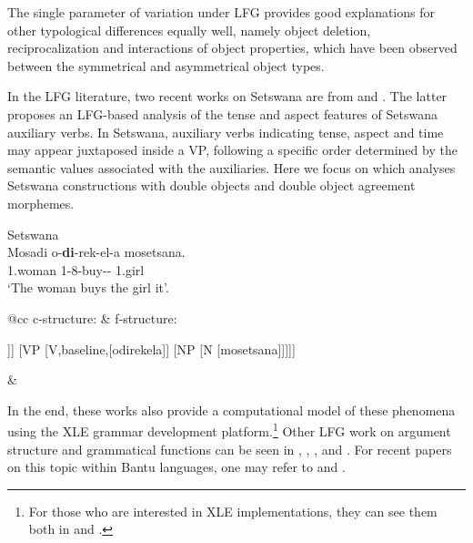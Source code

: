 \documentclass[output=paper,hidelinks]{langscibook}
\begin{document}
The single parameter of variation under LFG provides good explanations for other typological differences equally well, namely object deletion, reciprocalization and interactions of object properties, which have been observed between the symmetrical and asymmetrical object types. 

In the LFG literature, two recent works on Setswana are from \citet{Berg:Setswana} and \citet{PretoriusBerg:Aux}. The latter proposes an LFG-based analysis of the tense and aspect features of Setswana auxiliary verbs. In Setswana, auxiliary verbs indicating tense, aspect and time may appear juxtaposed inside a VP, following a specific order determined by the semantic values associated with the auxiliaries. Here we focus on \citet{Berg:Setswana} which analyses Setswana constructions with double objects and double object agreement morphemes. 

\ea\label{ex:African:27} Setswana\\
    \gll Mosadi o-\textbf{di}-rek-el-a mosetsana.\\
     1.woman     1-8-buy-{}-     1.girl   \\
    \glt ‘The woman buys the girl it’.
    \z

\ea
\begin{tabular}[t]{@{}cc}
  c-structure: & f-structure:\\[1ex]
{\begin{forest}
  [S [NP [N [mosadi]]]
    [VP [V,baseline,[odirekela]]
      [NP [N [mosetsana]]]]]
\end{forest}} & 
{}
\end{tabular}
\z

In the end, these works also provide a computational model of these phenomena using the XLE grammar development platform.\footnote{For those who are interested in XLE implementations, they can see them both in \citet{Dione2013} and \citet{Berg:Setswana}.} Other LFG work on argument structure and grammatical functions can be seen in \citet{Zaenen:Kikuyu}, \citet{Mchombo1980,Mchombo1999,Mchombo:Arg,Mchombo2003,Mchombo2004}, \citet{Harford1993}, and \citet{Kioko1995}. For recent papers on this topic within Bantu languages, one may refer to \citet{Matambirofa2010} and \citet{Matambirofa:Causative}.               
\end{document}
